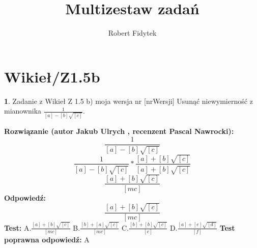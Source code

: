 \documentclass[12pt, a4paper]{article}
\title{Multizestaw zadań}
\author{Robert Fidytek}
\date{}
\theoremstyle{definition} %
\newtheorem{zad}{}
\newcommand{\kategoria}[1]{\section{#1}} %
\newcommand{\zadStart}[1]{\begin{zad}#1\newline} %
\newcommand{\zadStop}{\end{zad}}   %
\newcommand{\rozwStart}[2]{\noindent \textbf{Rozwiązanie (autor #1 , recenzent #2): }\newline} %
\newcommand{\rozwStop}{\newline}                                            %
\newcommand{\odpStart}{\noindent \textbf{Odpowiedź:}\newline}    %
\newcommand{\odpStop}{\newline}                                             %
\newcommand{\testStart}{\noindent \textbf{Test:}\newline} %
\newcommand{\testStop}{\newline} %
\newcommand{\kluczStart}{\noindent \textbf{Test poprawna odpowiedź:}\newline} %
\newcommand{\kluczStop}{\newline} %
\begin{document}
\maketitle


\kategoria{Wikieł/Z1.5b}
\zadStart{Zadanie z Wikieł Z 1.5 b) moja wersja nr [nrWersji]}
Usunąć niewymierność z mianownika $\frac{1}{[a]-[b]\sqrt{[c]}}$.
\zadStop
\rozwStart{Jakub Ulrych}{Pascal Nawrocki}
$$\frac{1}{[a]-[b]\sqrt{[c]}}$$
$$\frac{1}{[a]-[b]\sqrt{[c]}}*\frac{[a]+[b]\sqrt{[c]}}{[a]+[b]\sqrt{[c]}}$$
$$\frac{[a]+[b]\sqrt{[c]}}{[mc]}$$
\rozwStop
\odpStart
$$\frac{[a]+[b]\sqrt{[c]}}{[mc]}$$
\odpStop
\testStart
A.$\frac{[a]+[b]\sqrt{[c]}}{[mc]}$
B.$\frac{[b]+[a]\sqrt{[c]}}{[mc]}$
C.$\frac{[b]+[b]\sqrt{[c]}}{[e]}$
D.$\frac{[a]+[e]\sqrt{[d]}}{[f]}$
\testStop
\kluczStart
A
\kluczStop
\end{document}
